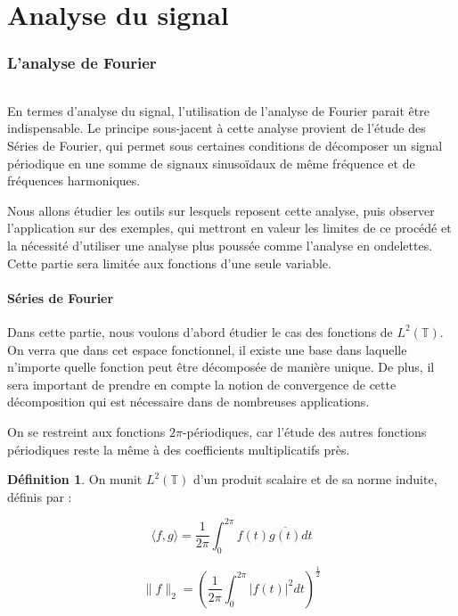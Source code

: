 \documentclass[]{article}
\theoremstyle{remark}
\theoremstyle{definition}
\newtheorem{mydef}{Définition}
\begin{document}
	\part{Analyse du signal}
	\section{L'analyse de Fourier}

	\paragraph*{}
En termes d'analyse du signal, l'utilisation de l'analyse de Fourier parait être indispensable. Le principe sous-jacent à cette analyse provient de l'étude des Séries de Fourier, qui permet sous certaines conditions de décomposer un signal périodique en une somme de signaux sinusoïdaux de même fréquence et de fréquences harmoniques. 

Nous allons étudier les outils sur lesquels reposent cette analyse, puis observer l'application sur des exemples, qui mettront en valeur les limites de ce procédé et la nécessité d'utiliser une analyse plus poussée comme l'analyse en ondelettes. Cette partie sera limitée aux fonctions d'une seule variable. 

	
	\subsection {Séries de Fourier}
		Dans cette partie, nous voulons d'abord étudier le cas des fonctions de $L^2(\mathbb{T})$. On verra que dans cet espace fonctionnel, il existe une base dans laquelle n'importe quelle fonction peut être décomposée de manière unique. De plus, il sera important de prendre en compte la notion de convergence de cette décomposition qui est nécessaire dans de nombreuses applications. 

		On se restreint aux fonctions $2\pi$-périodiques, car l'étude des autres fonctions périodiques reste la même à des coefficients multiplicatifs près. 	
		
			
		\begin{mydef} 
			
			On munit $L^2(\mathbb{T})$ d'un produit scalaire et de sa norme induite, définis par : 
			
			
			$$ \langle f,g \rangle = \frac{1}{2\pi} \int_{0}^{2\pi} f(t) \overline{g(t)} dt$$
				
			$$ \| f \|_2 =  \left( \frac{1}{2\pi} \int_0^{2\pi}| f(t) |^2 dt\right)^{\frac{1}{2}}$$	
				
		\end{mydef}		 
		 
\end{document}
